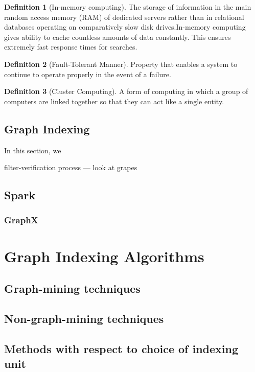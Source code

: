 \documentclass{l4proj}
\theoremstyle{definition}
\newtheorem{myDef}{Definition}
\begin{document}
        \begin{myDef}[In-memory computing]
        The storage of information in the main random access memory (RAM) of dedicated servers rather than in relational databases operating on comparatively slow disk drives.In-memory computing gives ability to cache countless amounts of data constantly. This ensures extremely fast response times for searches.
        \end{myDef}
        
        \begin{myDef} [Fault-Tolerant Manner] 
        Property that enables a system to continue to operate properly in the event of a failure.
        \end{myDef}
        
        \begin{myDef} [Cluster Computing]
        A form of computing in which a group of computers are linked together so that they can act like a single entity. 
        \end{myDef}
        
    \section{Graph Indexing}
        In this section, we  
        
        filter-verification process --- look at grapes
        
    \section{Spark}
        \subsection{GraphX}
        
\chapter{Graph Indexing Algorithms}
    \section{Graph-mining techniques}
    \section{Non-graph-mining techniques}
    \section{Methods with respect to choice of indexing unit}
\end{document}
